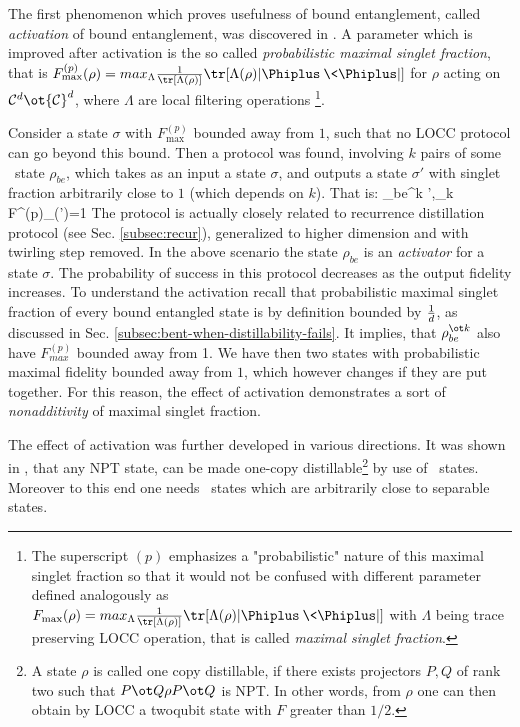 \documentclass[rmp,12pt,preprint]{revtex4-2}
\begin{document}
The first phenomenon which proves usefulness of bound entanglement,
called {\it activation} of bound entanglement, was discovered in
\cite{activation}. A parameter which is improved after activation is
the so called {\it probabilistic maximal singlet fraction}, that is
$F^{(p)}_{\max}(\rho)= max_{\Lambda}\frac{1}{{\tr}[\Lambda(\rho)]}{\tr}[\Lambda(\rho)|\Phiplus\>\<\Phiplus|]$
for $\rho$ acting on ${\cal C}^{d}\ot{\cal C}^{d}$,  where $\Lambda$ are
local filtering operations
\footnote{The superscript $(p)$ emphasizes a "probabilistic" nature of this maximal singlet fraction so that it would not  be confused with different parameter defined analogously as
$F_{\max}(\rho)=max_{\Lambda}\frac{1}{{\tr}[\Lambda(\rho)]}{\tr}[\Lambda(\rho)
|\Phiplus\>\<\Phiplus|]$ with $\Lambda$ being trace preserving LOCC operation, that is called {\it maximal
singlet fraction}.}.

Consider a state $\sigma$ with $F^{(p)}_{\max}$ bounded away
from $1$, such that no LOCC protocol can go beyond this bound.  Then a
protocol was found, involving $k$ pairs of some \bent\ state
$\rho_{be}$, which takes as an input a state $\sigma$, and outputs a
state $\sigma'$ with singlet fraction arbitrarily close to $1$ (which
depends on $k$). That is: \be \rho_{be}^{\ot k}\ot\sigma
\longrightarrow \sigma',\quad \lim_k F^{(p)}_{\max}(\sigma')=1 \ee The
protocol is actually closely related to recurrence distillation
protocol (see Sec. \ref{subsec:recur}), generalized to higher
dimension and with twirling step removed. In the above scenario the
state $\rho_{be}$ is an {\it activator} for a state $\sigma$. The
probability of success in this protocol decreases as the output
fidelity increases. To understand the activation recall that probabilistic maximal singlet fraction of every bound entangled state is by definition
bounded by ${1\over d}$, as discussed in
Sec. \ref{subsec:bent-when-distillability-fails}. It implies, that $\rho_{be}^{\ot k}$ also have $F^{(p)}_{max}$ bounded away from 1. We have then two states with probabilistic maximal fidelity bounded away from $1$, which however changes if they are put together. For this reason, the effect of activation demonstrates a sort of {\it nonadditivity} of maximal singlet fraction.


The effect of activation was further developed in various
directions. It was shown in \cite{VollbWolf_activation}, that any NPT
state, can be made one-copy distillable\footnote{A state $\rho$ is
  called one copy distillable, if there exists projectors $P,Q$ of
  rank two such that $P\ot Q \rho P\ot Q$ is NPT. In other words, from
  $\rho$ one can then obtain by LOCC a twoqubit state with $F$ greater
  than $1/2$.} by use of \bent\ states.  Moreover to this end one
needs \bent\ states which are arbitrarily close to separable states.
\end{document}
